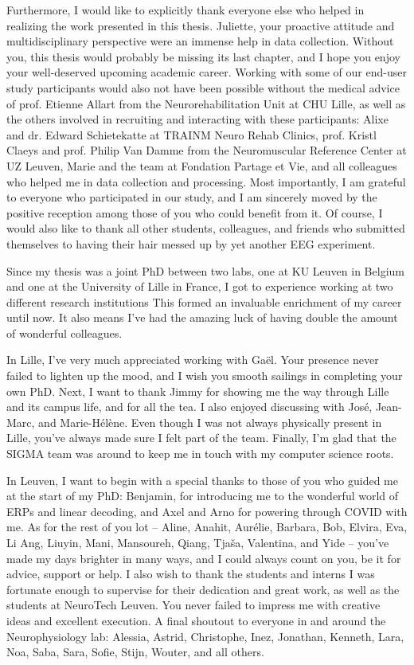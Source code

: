 Furthermore, I would like to explicitly thank everyone else who helped
in realizing the work presented in this thesis. Juliette, your
proactive attitude and multidisciplinary perspective were an immense help in
data collection. Without you, this thesis would probably be missing its
last chapter, and I hope you enjoy your well-deserved upcoming academic
career.
Working with some of our end-user study participants would also
not have been possible without the medical advice of prof. Etienne
Allart from the Neurorehabilitation Unit at CHU Lille, as well as
the others involved in recruiting and interacting with
these participants: Alixe and dr. Edward Schietekatte at TRAINM Neuro
Rehab Clinics, prof. Kristl Claeys and prof. Philip Van Damme from the
Neuromuscular Reference Center at UZ Leuven, Marie and the team at
Fondation Partage et Vie, and all colleagues who helped me in data
collection and processing. Most importantly, I am grateful to everyone
who participated in our study, and I am sincerely moved by the positive
reception among those of you who could benefit from it. Of course, I
would also like to thank all other students, colleagues, and friends who
submitted themselves to having their hair messed up by yet another EEG
experiment.

Since my thesis was a joint PhD between two labs, one at KU Leuven in
Belgium and one at the University of Lille in France, I got to
experience working at two different research institutions
This formed an invaluable enrichment of my career until now.
It also means I've had the amazing luck of having double the amount of wonderful
colleagues.

In Lille, I've very much appreciated working with Gaël. Your presence
never failed to lighten up the mood, and I wish you smooth sailings
in completing your own PhD. Next, I want to thank Jimmy for showing
me the way through Lille and its campus life, and for all the tea. I
also enjoyed discussing with José, Jean-Marc, and Marie-Hélène.
Even though I was not always physically
present in Lille, you've always made sure I felt part of the team.
Finally, I'm glad that the SIGMA team was around to keep me in touch with
my computer science roots.

In Leuven, I want to begin with a special thanks to those of you who
guided me at the start of my PhD: Benjamin, for introducing me to
the wonderful world of ERPs and linear decoding, and Axel and Arno for
powering through COVID with me. As for the rest of you lot -- Aline,
Anahit, Aurélie, Barbara, Bob, Elvira, Eva, Li Ang, Liuyin, Mani, Mansoureh,
Qiang, Tjaša, Valentina, and Yide -- you've made my days brighter in many ways,
and I could always count on you, be it for advice, support or help.
I also wish to thank the students and interns I was fortunate enough to
supervise for their dedication and great work, as well as the students at NeuroTech Leuven.
You never failed to impress me with creative ideas and excellent
execution. A final shoutout to everyone in and around the
Neurophysiology lab: Alessia, Astrid, Christophe, Inez, Jonathan,
Kenneth, Lara, Noa, Saba, Sara, Sofie, Stijn, Wouter, and all others.

